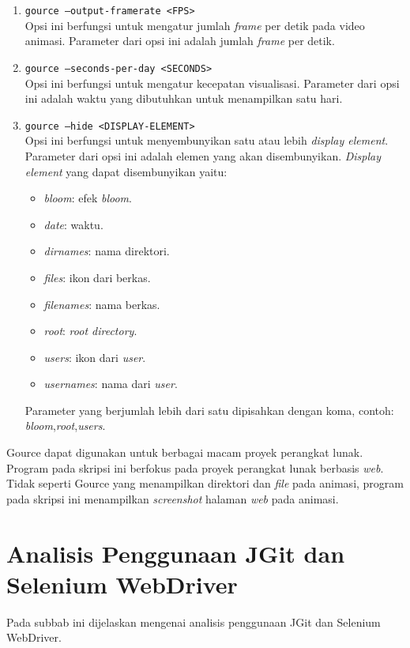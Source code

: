 \begin{enumerate}
\item \texttt{gource --output-framerate <FPS>}\\
Opsi ini berfungsi untuk mengatur jumlah \textit{frame} per detik pada video animasi. Parameter dari opsi ini adalah jumlah \textit{frame} per detik.

\item \texttt{gource --seconds-per-day <SECONDS>}\\
Opsi ini berfungsi untuk mengatur kecepatan visualisasi. Parameter dari opsi ini adalah waktu yang dibutuhkan untuk menampilkan satu hari.

\item \texttt{gource --hide <DISPLAY-ELEMENT>}\\
Opsi ini berfungsi untuk menyembunyikan satu atau lebih \textit{display element}. Parameter dari opsi ini adalah elemen yang akan disembunyikan. \textit{Display element} yang dapat disembunyikan yaitu:
\begin{itemize}
\item \textit{bloom}: efek \textit{bloom}. 
\item \textit{date}: waktu.  
\item \textit{dirnames}: nama direktori. 
\item \textit{files}: ikon dari berkas. 
\item \textit{filenames}: nama berkas. 
\item \textit{root}: \textit{root directory}.
\item \textit{users}: ikon dari \textit{user}.
\item \textit{usernames}: nama dari \textit{user}.
\end{itemize}
Parameter yang berjumlah lebih dari satu dipisahkan dengan koma, contoh: \textit{bloom},\textit{root},\textit{users}.
\end{enumerate}
 
Gource dapat digunakan untuk berbagai macam proyek perangkat lunak. Program pada skripsi ini berfokus pada proyek perangkat lunak berbasis \textit{web}. Tidak seperti Gource yang menampilkan direktori dan \textit{file} pada animasi, program pada skripsi ini menampilkan \textit{screenshot} halaman \textit{web} pada animasi.      
 
\section{Analisis Penggunaan JGit dan Selenium WebDriver}
\label{sec:analisis_jgit_selenium}
Pada subbab ini dijelaskan mengenai analisis penggunaan JGit dan Selenium WebDriver.

